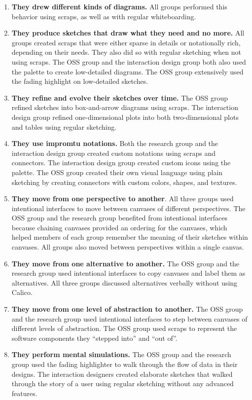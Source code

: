 \begin{enumerate}
	\item \textbf{They drew different kinds of diagrams.} All groups performed this behavior using scraps, as well as with regular whiteboarding.
	\item \textbf{They produce sketches that draw what they need and no more.} All groups created scraps that were either sparse in details or notationally rich, depending on their needs. They also did so with regular sketching when not using scraps. The OSS group and the interaction design group both also used the palette to create low-detailed diagrams. The OSS group extensively used the fading highlight on low-detailed sketches.
	\item \textbf{They refine and evolve their sketches over time.} The OSS group refined sketches into box-and-arrow diagrams using scraps. The interaction design group refined one-dimensional plots into both two-dimensional plots and tables using regular sketching.
	\item \textbf{They use impromtu notations.} Both the research group and the interaction design group created custom notations using scraps and connectors. The interaction design group created custom icons using the palette. The OSS group created their own visual language using plain sketching by creating connectors with custom colors, shapes, and textures.
	\item \textbf{They move from one perspective to another}. All three groups used intentional interfaces to move between canvases of different perspectives. The OSS group and the research group benefited from intentional interfaces because chaining canvases provided an ordering for the canvases, which helped members of each group remember the meaning of their sketches within canvases. All groups also moved between perspectives within a single canvas.
	\item \textbf{They move from one alternative to another.} The OSS group and the research group used intentional interfaces to copy canvases and label them as alternatives. All three groups discussed alternatives verbally without using Calico.
	\item \textbf{They move from one level of abstraction to another.} The OSS group and the research group used intentional interfaces to step between canvases of different levels of abstraction. The OSS group used scraps to represent the software components they ``stepped into'' and ``out of''.
	\item \textbf{They perform mental simulations.} The OSS group and the research group used the fading highlighter to walk through the flow of data in their designs. The interaction designers created elaborate sketches that walked through the story of a user using regular sketching without any advanced features.

\end{enumerate}
